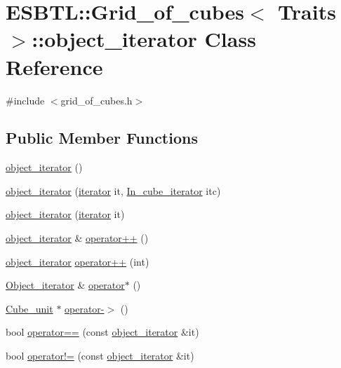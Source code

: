 \hypertarget{classESBTL_1_1Grid__of__cubes_1_1object__iterator}{}\section{E\+S\+B\+TL\+:\+:Grid\+\_\+of\+\_\+cubes$<$ Traits $>$\+:\+:object\+\_\+iterator Class Reference}
\label{classESBTL_1_1Grid__of__cubes_1_1object__iterator}


{\ttfamily \#include $<$grid\+\_\+of\+\_\+cubes.\+h$>$}

\subsection*{Public Member Functions}
\begin{DoxyCompactItemize}
\item 
\hyperlink{classESBTL_1_1Grid__of__cubes_1_1object__iterator_ade271a0528949eaafd1d132e923d51d3}{object\+\_\+iterator} ()
\item 
\hyperlink{classESBTL_1_1Grid__of__cubes_1_1object__iterator_abaa8b1c0c35d741a1b890990f5a53c14}{object\+\_\+iterator} (\hyperlink{classESBTL_1_1Grid__of__cubes_1_1iterator}{iterator} it, \hyperlink{structESBTL_1_1Grid__of__cubes_a1586dac85e561a73b591da3cf07a47b1}{In\+\_\+cube\+\_\+iterator} itc)
\item 
\hyperlink{classESBTL_1_1Grid__of__cubes_1_1object__iterator_ab31b4d094b8975e5588e8b7cd0c8115b}{object\+\_\+iterator} (\hyperlink{classESBTL_1_1Grid__of__cubes_1_1iterator}{iterator} it)
\item 
\hyperlink{classESBTL_1_1Grid__of__cubes_1_1object__iterator}{object\+\_\+iterator} \& \hyperlink{classESBTL_1_1Grid__of__cubes_1_1object__iterator_ae9b040a5ef31ab3d809417d124868263}{operator++} ()
\item 
\hyperlink{classESBTL_1_1Grid__of__cubes_1_1object__iterator}{object\+\_\+iterator} \hyperlink{classESBTL_1_1Grid__of__cubes_1_1object__iterator_afafc104603aabb65ab4c85c3731b1e6a}{operator++} (int)
\item 
\hyperlink{structESBTL_1_1Grid__of__cubes_ae77665f05d6c7ae05c3d2d764df99193}{Object\+\_\+iterator} \& \hyperlink{classESBTL_1_1Grid__of__cubes_1_1object__iterator_aa037306d61ffcf82aa0c88d3df470872}{operator$\ast$} ()
\item 
\hyperlink{structESBTL_1_1Grid__of__cubes_1_1Cube__unit}{Cube\+\_\+unit} $\ast$ \hyperlink{classESBTL_1_1Grid__of__cubes_1_1object__iterator_a4c50c8eb4de7ca977382405d39d51ae8}{operator-\/$>$} ()
\item 
bool \hyperlink{classESBTL_1_1Grid__of__cubes_1_1object__iterator_a715d66fdedfae22f18c85aa14aada3e1}{operator==} (const \hyperlink{classESBTL_1_1Grid__of__cubes_1_1object__iterator}{object\+\_\+iterator} \&it)
\item 
bool \hyperlink{classESBTL_1_1Grid__of__cubes_1_1object__iterator_a7f43e1c35ee8287612cd4db94d923f56}{operator!=} (const \hyperlink{classESBTL_1_1Grid__of__cubes_1_1object__iterator}{object\+\_\+iterator} \&it)
\end{DoxyCompactItemize}
